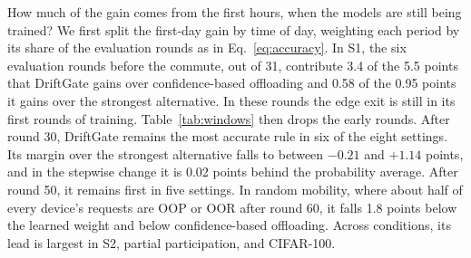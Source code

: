 How much of the gain comes from the first hours, when the models are still being trained? We first split the first-day gain by time of day, weighting each period by its share of the evaluation rounds as in Eq.~\eqref{eq:accuracy}. In S1, the six evaluation rounds before the commute, out of 31, contribute 3.4 of the 5.5 points that DriftGate gains over confidence-based offloading and 0.58 of the 0.95 points it gains over the strongest alternative. In these rounds the edge exit is still in its first rounds of training. Table~\ref{tab:windows} then drops the early rounds. After round 30, DriftGate remains the most accurate rule in six of the eight settings. Its margin over the strongest alternative falls to between $-0.21$ and $+1.14$ points, and in the stepwise change it is 0.02 points behind the probability average. After round 50, it remains first in five settings. In random mobility, where about half of every device's requests are OOP or OOR after round 60, it falls 1.8 points below the learned weight and below confidence-based offloading. Across conditions, its lead is largest in S2, partial participation, and CIFAR-100.

